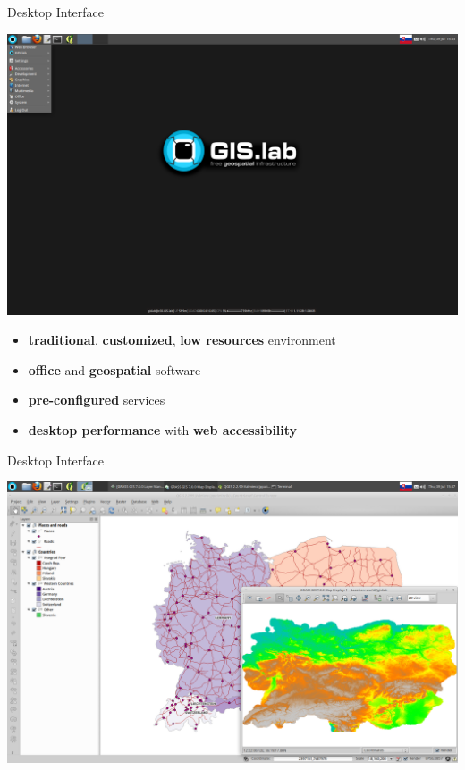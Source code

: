 \documentclass[12pt]{beamer}
\begin{document}
\begin{frame}{Desktop Interface}
	\begin{center}
		\includegraphics[keepaspectratio=true,height=0.5\textheight]{images/gislab-desktop.png}
	\end{center}
	\begin{itemize}
		\item \textbf{traditional}, \textbf{customized}, \textbf{low resources} environment
		\item \textbf{office} and \textbf{geospatial} software
		\item \textbf{pre-configured} services
		\item \textbf{desktop performance} with \textbf{web accessibility}
	\end{itemize}
\end{frame}

\begin{frame}[plain]{Desktop Interface}
	\begin{center}
		\includegraphics[keepaspectratio=true,width=\textwidth]{images/gislab-desktop-2.png}
	\end{center}
\end{frame}
\end{document}
